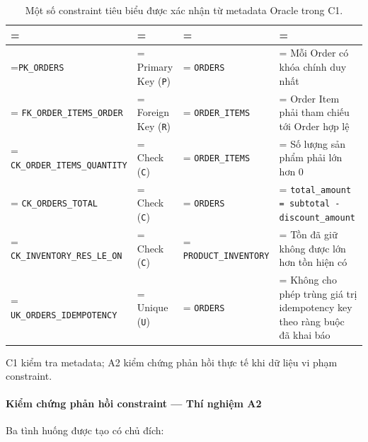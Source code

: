 \begin{table}[!htbp]
\centering
\caption{Một số constraint tiêu biểu được xác nhận từ metadata Oracle trong C1.}\label{tab:tx-8}
\reporttablesetup
\begin{tabularx}{\linewidth}{|>{\hsize\linewidth=\hsize}L|>{\hsize\linewidth=\hsize}L|>{\hsize\linewidth=\hsize}L|>{\hsize\linewidth=\hsize}L|}
\hline
{}
 &  &  &  \\ \hline
\texttt{PK\_\allowbreak{}ORDERS} & Primary Key (\texttt{P}) & \texttt{ORDERS} & Mỗi Order có khóa chính duy nhất \\ \hline
\texttt{FK\_\allowbreak{}ORDER\_\allowbreak{}ITEMS\_\allowbreak{}ORDER} & Foreign Key (\texttt{R}) & \texttt{ORDER\_\allowbreak{}ITEMS} & Order Item phải tham chiếu tới Order hợp lệ \\ \hline
\texttt{CK\_\allowbreak{}ORDER\_\allowbreak{}ITEMS\_\allowbreak{}QUANTITY} & Check (\texttt{C}) & \texttt{ORDER\_\allowbreak{}ITEMS} & Số lượng sản phẩm phải lớn hơn 0 \\ \hline
\texttt{CK\_\allowbreak{}ORDERS\_\allowbreak{}TOTAL} & Check (\texttt{C}) & \texttt{ORDERS} & \texttt{total\_\allowbreak{}amount =\allowbreak{} subtotal -\allowbreak{} discount\_\allowbreak{}amount} \\ \hline
\texttt{CK\_\allowbreak{}INVENTORY\_\allowbreak{}RES\_\allowbreak{}LE\_\allowbreak{}ON} & Check (\texttt{C}) & \texttt{PRODUCT\_\allowbreak{}INVENTORY} & Tồn đã giữ không được lớn hơn tồn hiện có \\ \hline
\texttt{UK\_\allowbreak{}ORDERS\_\allowbreak{}IDEMPOTENCY} & Unique (\texttt{U}) & \texttt{ORDERS} & Không cho phép trùng giá trị idempotency key theo ràng buộc đã khai báo \\ \hline
\end{tabularx}
\end{table}
C1 kiểm tra metadata; A2 kiểm chứng phản hồi thực tế khi dữ liệu vi phạm constraint.

\paragraph*{Kiểm chứng phản hồi constraint — Thí nghiệm A2}

Ba tình huống được tạo có chủ đích:

